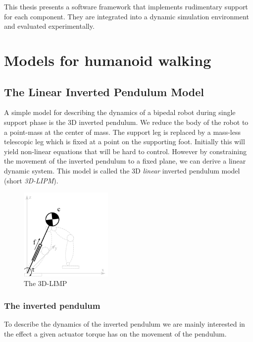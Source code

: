 \documentclass[english,ngerman]{KITreprt}
\begin{document}
This thesis presents a software framework that implements rudimentary
support for each component. They are integrated into a dynamic
simulation environment and evaluated experimentally.

\chapter{Models for humanoid walking}\label{section:walking-models}

\section{The Linear Inverted Pendulum
Model}\label{the-linear-inverted-pendulum-model}

A simple model for describing the dynamics of a bipedal robot during
single support phase is the 3D inverted pendulum. We reduce the body of
the robot to a point-mass at the center of mass. The support leg is
replaced by a mass-less telescopic leg which is fixed at a point on the
supporting foot. Initially this will yield non-linear equations that
will be hard to control. However by constraining the movement of the
inverted pendulum to a fixed plane, we can derive a linear dynamic
system. This model is called the 3D \emph{linear} inverted pendulum
model (short \emph{3D-LIPM}).

\begin{figure}
  \begin{center}
     \includegraphics[width=0.4\textwidth]{images/3dlimp.png}
  \end{center}
  \caption{The 3D-LIMP}
\end{figure}

\subsection{The inverted pendulum}\label{the-inverted-pendulum}

To describe the dynamics of the inverted pendulum we are mainly
interested in the effect a given actuator torque has on the movement of
the pendulum.
\end{document}
